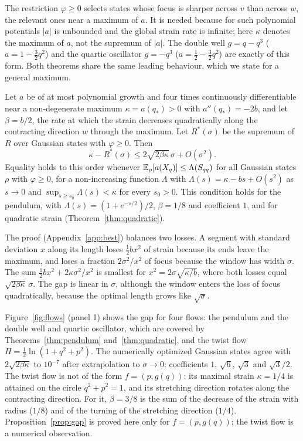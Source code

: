 The restriction $\varphi \geq 0$ selects states whose focus is sharper across $v$ than across $w$, the relevant ones near a maximum of $a$. It is needed because for such polynomial potentials $|a|$ is unbounded and the global strain rate is infinite; here $\kappa$ denotes the maximum of $a$, not the supremum of $|a|$. The double well $g = q - q^3$ ($a = 1 - \tfrac32 q^2$) and the quartic oscillator $g = -q^3$ ($a = \tfrac12 - \tfrac32q^2$) are exactly of this form. Both theorems share the same leading behaviour, which we state for a general maximum.

\begin{proposition}
\label{prop:gap}
Let $a$ be of at most polynomial growth and four times continuously differentiable near a non-degenerate maximum $\kappa = a(q_*) > 0$ with $a''(q_*) = -2b$, and let $\beta = b/2$, the rate at which the strain decreases quadratically along the contracting direction $w$ through the maximum. Let $R^*(\sigma)$ be the supremum of $R$ over Gaussian states with $\varphi \geq 0$. Then
\begin{equation}
\kappa - R^*(\sigma) \leq 2\sqrt{2\beta\kappa}\,\sigma + O(\sigma^2) .
\label{eq:gap}
\end{equation}
Equality holds to this order whenever $\mathbb{E}_\rho[a(X_q)] \leq \Lambda(S_{qq})$ for all Gaussian states $\rho$ with $\varphi \geq 0$, for a non-increasing function $\Lambda$ with $\Lambda(s) = \kappa - bs + O(s^2)$ as $s \to 0$ and $\sup_{s \geq s_0}\Lambda(s) < \kappa$ for every $s_0 > 0$. This condition holds for the pendulum, with $\Lambda(s) = (1 + e^{-s/2})/2$, $\beta = 1/8$ and coefficient $1$, and for quadratic strain (Theorem~\ref{thm:quadratic}).
\end{proposition}

The proof (Appendix~\ref{app:best}) balances two losses. A segment with standard deviation $x$ along its length loses $\tfrac12 b x^2$ of strain because its ends leave the maximum, and loses a fraction $2\sigma^2/x^2$ of focus because the window has width $\sigma$. The sum $\tfrac12 b x^2 + 2\kappa\sigma^2/x^2$ is smallest for $x^2 = 2\sigma\sqrt{\kappa/b}$, where both losses equal $\sqrt{2\beta\kappa}\,\sigma$. The gap is linear in $\sigma$, although the window enters the loss of focus quadratically, because the optimal length grows like $\sqrt\sigma$.

Figure~\ref{fig:flows} (panel 1) shows the gap for four flows: the pendulum and the double well and quartic oscillator, which are covered by Theorems~\ref{thm:pendulum} and~\ref{thm:quadratic}, and the twist flow $H = \tfrac12\ln(1+q^2+p^2)$. The numerically optimized Gaussian states agree with $2\sqrt{2\beta\kappa}$ to $10^{-7}$ after extrapolation to $\sigma\to0$: coefficients $1$, $\sqrt6$, $\sqrt3$ and $\sqrt3/2$. The twist flow is not of the form $f = (p,g(q))$: its maximal strain $\kappa = 1/4$ is attained on the circle $q^2+p^2 = 1$, and its stretching direction rotates along the contracting direction. For it, $\beta = 3/8$ is the sum of the decrease of the strain with radius ($1/8$) and of the turning of the stretching direction ($1/4$). Proposition~\ref{prop:gap} is proved here only for $f = (p,g(q))$; the twist flow is a numerical observation.
